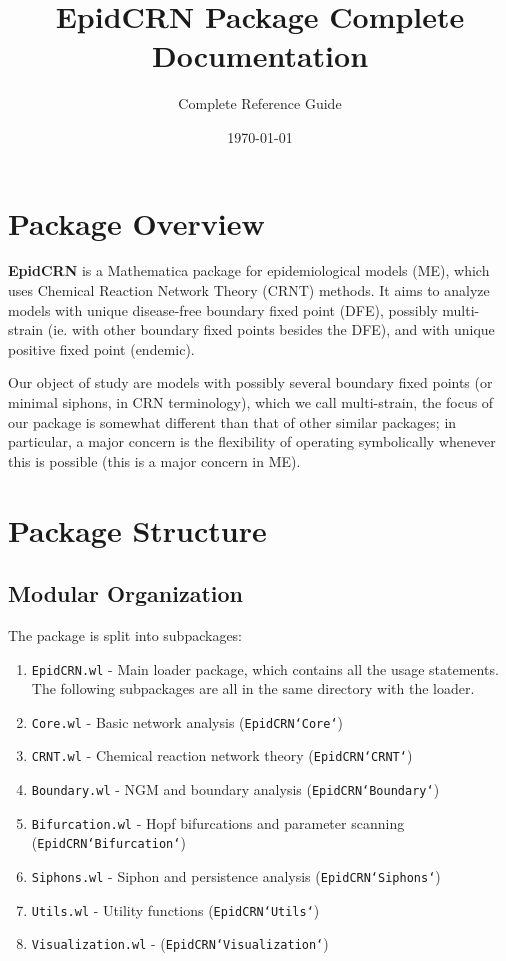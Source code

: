 \documentclass{article}
\title{EpidCRN Package Complete Documentation}
\author{Complete Reference Guide}
\date{\today}
\begin{document}
\maketitle
\tableofcontents

\section{Package Overview}

\textbf{EpidCRN} is a Mathematica package for epidemiological models (ME), which uses Chemical Reaction Network Theory (CRNT) methods. It aims to analyze models with unique disease-free boundary fixed point (DFE), possibly multi-strain (ie. with other boundary fixed points besides the DFE), and with unique positive fixed point (endemic).

Our object of study are models with possibly several boundary fixed points (or minimal siphons, in CRN terminology), which we call multi-strain, the focus of our package is somewhat different than that of other similar packages; in particular, a major concern is the flexibility of operating symbolically whenever this is possible (this is a major concern in ME).

\section{Package Structure}

\subsection{Modular Organization}
The package is split into subpackages:

\begin{enumerate}
\item \texttt{EpidCRN.wl} - Main loader package, which contains all the usage statements. The following subpackages are all in the same directory with the loader.
\item \texttt{Core.wl} - Basic network analysis (\texttt{EpidCRN`Core`})
\item \texttt{CRNT.wl} - Chemical reaction network theory (\texttt{EpidCRN`CRNT`})
\item \texttt{Boundary.wl} - NGM and boundary analysis (\texttt{EpidCRN`Boundary`})
\item \texttt{Bifurcation.wl} - Hopf bifurcations and parameter scanning (\texttt{EpidCRN`Bifurcation`})
\item \texttt{Siphons.wl} - Siphon and persistence analysis (\texttt{EpidCRN`Siphons`})
\item \texttt{Utils.wl} - Utility functions (\texttt{EpidCRN`Utils`})
\item \texttt{Visualization.wl} - (\texttt{EpidCRN`Visualization`})
\end{enumerate}
\end{document}
